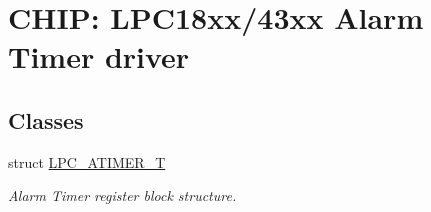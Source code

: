 \hypertarget{group___a_t_i_m_e_r__18_x_x__43_x_x}{}\section{C\+H\+IP\+: L\+P\+C18xx/43xx Alarm Timer driver}
\label{group___a_t_i_m_e_r__18_x_x__43_x_x}
\subsection*{Classes}
\begin{DoxyCompactItemize}
\item 
struct \hyperlink{struct_l_p_c___a_t_i_m_e_r___t}{L\+P\+C\+\_\+\+A\+T\+I\+M\+E\+R\+\_\+T}
\begin{DoxyCompactList}\small\item\em Alarm Timer register block structure. \end{DoxyCompactList}\end{DoxyCompactItemize}
